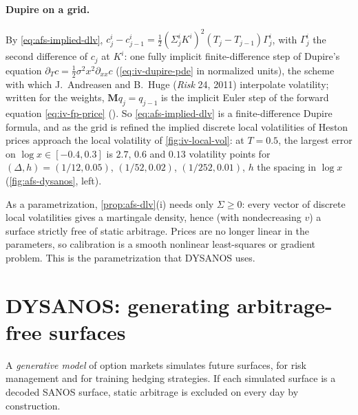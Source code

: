\paragraph{Dupire on a grid.} By \eqref{eq:afs-implied-dlv}, $c_j^i-c_{j-1}^i=\frac12(\Sigma_j^iK^i)^2(T_j-T_{j-1})\Gamma_j^i$, with $\Gamma_j^i$ the
second difference of $c_j$ at $K^i$: one fully implicit finite-difference step of Dupire's equation
$\partial_Tc=\frac12\sigma^2x^2\partial_{xx}c$ (\cref{eq:iv-dupire-pde} in normalized units), the scheme with which J.~Andreasen and
B.~Huge (\emph{Risk} 24, 2011) interpolate volatility; written for the weights, $\mathbf Mq_j=q_{j-1}$ is the implicit Euler step of the
forward equation \eqref{eq:iv-fp-price} (). So \eqref{eq:afs-implied-dlv} is a finite-difference
Dupire formula, and as the grid is refined the implied discrete local volatilities of Heston prices approach the local
volatility of \cref{fig:iv-local-vol}: at $T=0.5$, the largest error on $\log x\in[-0.4,0.3]$ is $2.7$, $0.6$ and $0.13$ volatility
points for $(\Delta,h)=(1/12,0.05)$, $(1/52,0.02)$, $(1/252,0.01)$, $h$ the spacing in $\log x$ (\cref{fig:afs-dysanos}, left).

As a parametrization, \cref{prop:afs-dlv}(i) needs only $\Sigma\ge0$: every vector of discrete local volatilities gives a
martingale density, hence (with nondecreasing $v$) a surface strictly free of static arbitrage. Prices are no longer linear in
the parameters, so calibration is a smooth nonlinear least-squares or gradient problem. This is the parametrization that
DYSANOS uses.

\section{DYSANOS: generating arbitrage-free surfaces}\label{sec:afs-dysanos}

A \emph{generative model} of option markets simulates future surfaces, for risk management and for training hedging
strategies. If each simulated surface is a decoded SANOS surface, static arbitrage is excluded on every day by construction.

